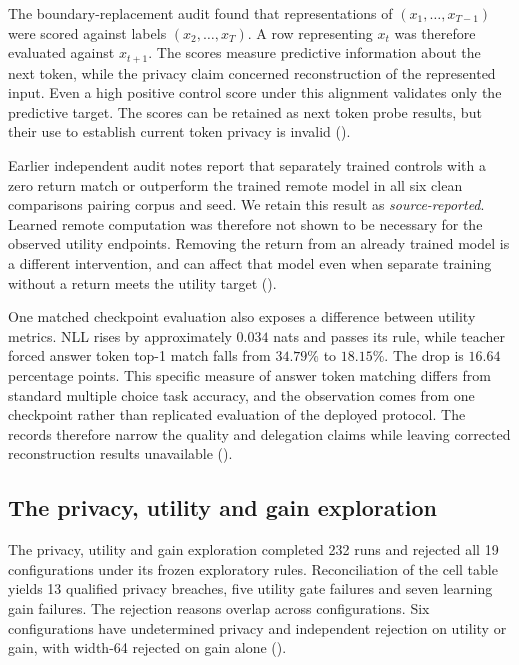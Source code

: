 The boundary-replacement audit found that representations of
$(x_1,\ldots,x_{T-1})$ were scored against labels
$(x_2,\ldots,x_T)$.
A row representing $x_t$ was therefore evaluated against $x_{t+1}$.
The scores measure predictive information about the next token, while
the privacy claim concerned reconstruction of the represented input.
Even a high positive control score under this alignment validates only
the predictive target. The scores can be retained as next token probe
results, but their use to establish current token privacy is invalid
().

Earlier independent audit notes report that separately trained controls
with a zero return match or outperform the trained remote model in all
six clean comparisons pairing corpus and seed. We retain this result as
\emph{source-reported}. Learned remote computation was therefore not shown
to be necessary for the observed utility endpoints. Removing the return
from an already trained model is a different intervention, and can affect
that model even when separate training without a return meets the utility
target ().

One matched checkpoint evaluation also exposes a difference between
utility metrics. NLL rises by approximately $0.034$ nats and passes its
rule, while teacher forced answer token top-1 match falls from $34.79\%$
to $18.15\%$. The drop is $16.64$ percentage points. This specific measure
of answer token matching differs from standard multiple choice task
accuracy, and the observation comes from one checkpoint rather than
replicated evaluation of the deployed protocol. The records therefore
narrow the quality and delegation claims while leaving corrected
reconstruction results unavailable ().

\subsection{The privacy, utility and gain exploration}
\label{sec:f3}

The privacy, utility and gain exploration completed 232 runs and rejected
all 19 configurations under its frozen exploratory rules. Reconciliation
of the cell table yields 13 qualified privacy breaches, five utility gate
failures and seven learning gain failures. The rejection reasons overlap
across configurations. Six configurations have undetermined privacy and
independent rejection on utility or gain, with width-64 rejected on gain
alone ().

